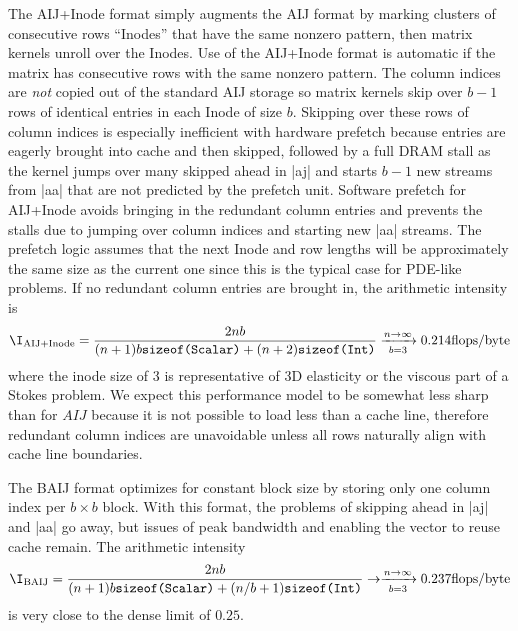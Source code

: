 The AIJ+Inode format simply augments the AIJ format by marking clusters of consecutive rows ``Inodes'' that have the same nonzero pattern, then matrix kernels unroll over the Inodes.
Use of the AIJ+Inode format is automatic if the matrix has consecutive rows with the same nonzero pattern.
The column indices are \emph{not} copied out of the standard AIJ storage so matrix kernels skip over $b-1$ rows of identical entries in each Inode of size $b$.
Skipping over these rows of column indices is especially inefficient with hardware prefetch because entries are eagerly brought into cache and then skipped, followed by a full DRAM stall as the kernel jumps over many skipped ahead in \cverb|aj| and starts $b-1$ new streams from \cverb|aa| that are not predicted by the prefetch unit.
Software prefetch for AIJ+Inode avoids bringing in the redundant column entries and prevents the stalls due to jumping over column indices and starting new \cverb|aa| streams.
The prefetch logic assumes that the next Inode and row lengths will be approximately the same size as the current one since this is the typical case for PDE-like problems.
If no redundant column entries are brought in, the arithmetic intensity is
\begin{align*}
  \I_{\text{AIJ+Inode}} = \frac{2nb}{(n+1)b\texttt{sizeof(Scalar)} + (n+2)\texttt{sizeof(Int)}} \xrightarrow[b=3]{n\to\infty} 0.214 \text{flops/byte}
\end{align*}
where the inode size of 3 is representative of 3D elasticity or the viscous part of a Stokes problem.
We expect this performance model to be somewhat less sharp than for $AIJ$ because it is not possible to load less than a cache line, therefore redundant column indices are unavoidable unless all rows naturally align with cache line boundaries.

The BAIJ format optimizes for constant block size by storing only one column index per $b\times b$ block.
With this format, the problems of skipping ahead in \cverb|aj| and \cverb|aa| go away, but issues of peak bandwidth and enabling the vector to reuse cache remain.
The arithmetic intensity
\begin{align*}
  \I_{\text{BAIJ}} = \frac{2nb}{(n+1)b\texttt{sizeof(Scalar)} + (n/b+1)\texttt{sizeof(Int)}} \to \xrightarrow[b=3]{n\to\infty} 0.237 \text{flops/byte}
\end{align*}
is very close to the dense limit of $0.25$.

